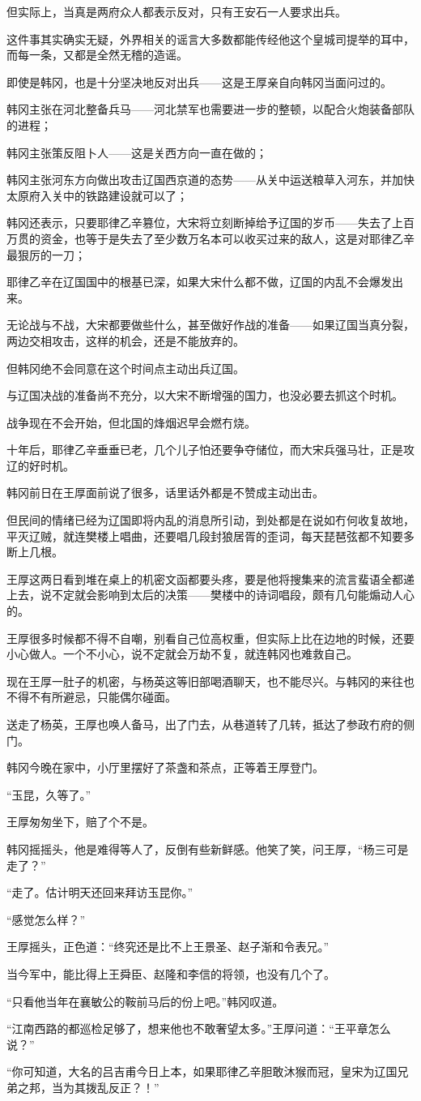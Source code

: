 但实际上，当真是两府众人都表示反对，只有王安石一人要求出兵。

这件事其实确实无疑，外界相关的谣言大多数都能传经他这个皇城司提举的耳中，而每一条，又都是全然无稽的造谣。

即使是韩冈，也是十分坚决地反对出兵——这是王厚亲自向韩冈当面问过的。

韩冈主张在河北整备兵马——河北禁军也需要进一步的整顿，以配合火炮装备部队的进程；

韩冈主张策反阻卜人——这是关西方向一直在做的；

韩冈主张河东方向做出攻击辽国西京道的态势——从关中运送粮草入河东，并加快太原府入关中的铁路建设就可以了；

韩冈还表示，只要耶律乙辛篡位，大宋将立刻断掉给予辽国的岁币——失去了上百万贯的资金，也等于是失去了至少数万名本可以收买过来的敌人，这是对耶律乙辛最狠厉的一刀；

耶律乙辛在辽国国中的根基已深，如果大宋什么都不做，辽国的内乱不会爆发出来。

无论战与不战，大宋都要做些什么，甚至做好作战的准备——如果辽国当真分裂，两边交相攻击，这样的机会，还是不能放弃的。

但韩冈绝不会同意在这个时间点主动出兵辽国。

与辽国决战的准备尚不充分，以大宋不断增强的国力，也没必要去抓这个时机。

战争现在不会开始，但北国的烽烟迟早会燃冇烧。

十年后，耶律乙辛垂垂已老，几个儿子怕还要争夺储位，而大宋兵强马壮，正是攻辽的好时机。

韩冈前日在王厚面前说了很多，话里话外都是不赞成主动出击。

但民间的情绪已经为辽国即将内乱的消息所引动，到处都是在说如冇何收复故地，平灭辽贼，就连樊楼上唱曲，还要唱几段封狼居胥的歪词，每天琵琶弦都不知要多断上几根。

王厚这两日看到堆在桌上的机密文函都要头疼，要是他将搜集来的流言蜚语全都递上去，说不定就会影响到太后的决策——樊楼中的诗词唱段，颇有几句能煽动人心的。

王厚很多时候都不得不自嘲，别看自己位高权重，但实际上比在边地的时候，还要小心做人。一个不小心，说不定就会万劫不复，就连韩冈也难救自己。

现在王厚一肚子的机密，与杨英这等旧部喝酒聊天，也不能尽兴。与韩冈的来往也不得不有所避忌，只能偶尔碰面。

送走了杨英，王厚也唤人备马，出了门去，从巷道转了几转，抵达了参政冇府的侧门。

韩冈今晚在家中，小厅里摆好了茶盏和茶点，正等着王厚登门。

“玉昆，久等了。”

王厚匆匆坐下，赔了个不是。

韩冈摇摇头，他是难得等人了，反倒有些新鲜感。他笑了笑，问王厚，“杨三可是走了？”

“走了。估计明天还回来拜访玉昆你。”

“感觉怎么样？”

王厚摇头，正色道：“终究还是比不上王景圣、赵子渐和令表兄。”

当今军中，能比得上王舜臣、赵隆和李信的将领，也没有几个了。

“只看他当年在襄敏公的鞍前马后的份上吧。”韩冈叹道。

“江南西路的都巡检足够了，想来他也不敢奢望太多。”王厚问道：“王平章怎么说？”

“你可知道，大名的吕吉甫今日上本，如果耶律乙辛胆敢沐猴而冠，皇宋为辽国兄弟之邦，当为其拨乱反正？！”
